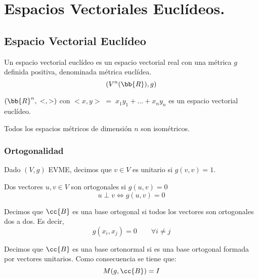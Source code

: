 \chapter{Espacios Vectoriales Euclídeos.}

\section{Espacio Vectorial Euclídeo}
\begin{definicion}
    Un espacio vectorial euclídeo es un espacio vectorial real con una métrica $g$ definida positiva, denominada métrica euclídea.
    \begin{equation*}
        (V^n(\bb{R}),g)
    \end{equation*}
\end{definicion}

\begin{ejemplo}
    $(\bb{R}^n,\;<,>)$ con $<x,y>\;=\;x_1y_1 +\dots +x_ny_n$ es un espacio vectorial euclídeo.
\end{ejemplo}

\begin{prop}
    Todos los espacios métricos de dimensión $n$ son isométricos.
\end{prop}

\subsection{Ortogonalidad}

\begin{definicion} 
    Dado $(V,g)$ EVME, decimos que $v\in V$ es unitario si $g(v,v)=1$.
\end{definicion}

\begin{definicion}
    Dos vectores $u,v\in V$ son ortogonales si $g(u,v)=0$
    \begin{equation*}
        u\perp v \Longleftrightarrow g(u,v)=0
    \end{equation*}
\end{definicion}

\begin{definicion} 
    Decimos que $\cc{B}$ es una base ortogonal si todos los vectores son ortogonales dos a dos. Es decir,
    $$g(x_i,x_j)=0\qquad \forall i\neq j$$
\end{definicion}

\begin{definicion} 
    Decimos que $\cc{B}$ es una base ortonormal si es una base ortogonal formada por vectores unitarios. Como consecuencia se tiene que:
    $$M(g,\cc{B}) = I$$
\end{definicion}

